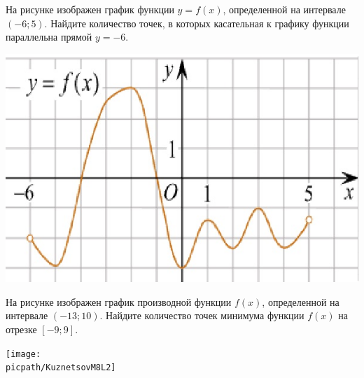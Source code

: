 \begin{consultation}
\begin{listofex}
		\item
		\begin{minipage}[t]{0.5\linewidth}
			На рисунке изображен график функции \(y = f(x)\), определенной на интервале \((-6; 5)\). Найдите количество точек, в которых касательная к графику функции параллельна прямой \(y=-6\).
		\end{minipage}
		\hspace{0.02\linewidth}
		\begin{minipage}[t]{0.45\linewidth}
			\includegraphics[align=t, width=\linewidth]{../pics/G111M3H2-4}
		\end{minipage}
		\newpage
		\item На рисунке изображен график производной функции \( f(x) \), определенной на интервале \( (-13; 10) \). Найдите количество точек минимума функции \( f(x) \) на отрезке \( [-9;9] \).
		\begin{center}
			\texttt{[image: \\picpath/KuznetsovM8L2]}
		\end{center}
	\end{listofex}
\end{consultation}
